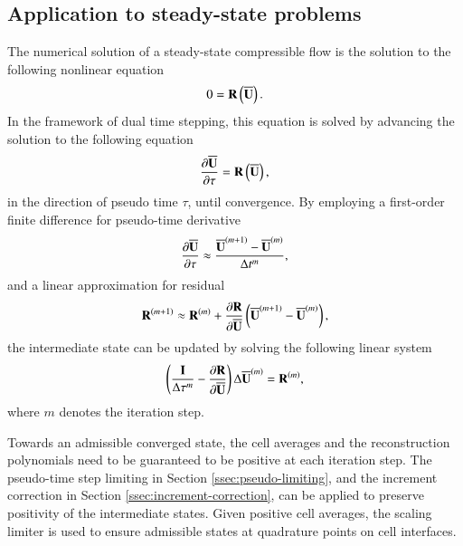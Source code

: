 \begin{algorithm}[htbp!]
\begin{algorithmic}[1]
 		
 		
 		
 	\end{algorithmic}  
 \end{algorithm}  

 

\subsection{Application to steady-state problems}
\label{ssec:application-to-steady-state}

The numerical solution of a steady-state compressible flow is the solution to the following nonlinear equation
\begin{equation}
    0 = \mathbf{R} \left(\overline{\mathbf{U}}\right).
\end{equation}
In the framework of dual time stepping, this equation is solved by advancing the solution to the following equation
\begin{equation}
    \dfrac{\partial \overline{\mathbf{U}}}{\partial \tau} = \mathbf{R} \left(\overline{\mathbf{U}}\right),
\end{equation}
in the direction of pseudo time $\tau$, until convergence. By employing a first-order finite difference for pseudo-time derivative
\begin{equation}
    \dfrac{\partial \overline{\mathbf{U}}}{\partial \tau} \approx \dfrac{\overline{\mathbf{U}}^{(m+1)}-\overline{\mathbf{U}}^{(m)}}{\mathrm\Delta t^m},
\end{equation}
and a linear approximation for residual
\begin{equation}
    \mathbf{R}^{(m+1)} \approx \mathbf{R}^{(m)} + \dfrac{\partial \mathbf{R}}{\partial \overline{\mathbf{U}}} \left(\overline{\mathbf{U}}^{(m+1)}-\overline{\mathbf{U}}^{(m)}\right),
\end{equation}
the intermediate state can be updated by solving the following linear system
\begin{equation}
    \left(\frac{\eye}{\inc \tau^m} -\partialderivative{\R }{\uu} \right) \inc \uu^{\left(m\right)}
    = \R^{\left(m\right)},
\end{equation}
where $m$ denotes the iteration step. 

Towards an admissible converged state, the cell averages and the reconstruction polynomials need to be guaranteed to be positive at each iteration step. The pseudo-time step limiting in Section \ref{ssec:pseudo-limiting}, and the increment correction in Section \ref{ssec:increment-correction}, can be applied to preserve positivity of the intermediate states. Given positive cell averages, the scaling limiter is used to ensure admissible states at quadrature points on cell interfaces. 




\endgroup